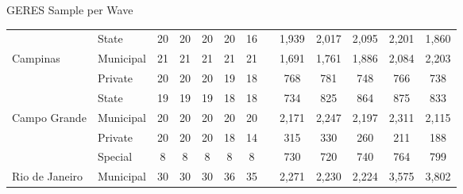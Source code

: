 \documentclass{beamer}
\begin{document}
\begin{frame}[label=SampleWave]{GERES Sample per Wave}
\begin{table}[H]
\begin{adjustbox}{max width=\textwidth}
\begin{tabular}{llllllllllllr}
\cmidrule{1-7}\cmidrule{9-13}          & State & \multicolumn{1}{c}{20 } & \multicolumn{1}{c}{20 } & \multicolumn{1}{c}{20 } & \multicolumn{1}{c}{20 } & \multicolumn{1}{c}{16 } &       & \multicolumn{1}{c}{1,939 } & \multicolumn{1}{c}{2,017} & \multicolumn{1}{c}{2,095 } & \multicolumn{1}{c}{2,201 } & \multicolumn{1}{c}{1,860 } \\
    Campinas & Municipal & \multicolumn{1}{c}{21 } & \multicolumn{1}{c}{21 } & \multicolumn{1}{c}{21 } & \multicolumn{1}{c}{21 } & \multicolumn{1}{c}{21 } &       & \multicolumn{1}{c}{1,691 } & \multicolumn{1}{c}{1,761} & \multicolumn{1}{c}{1,886 } & \multicolumn{1}{c}{2,084 } & \multicolumn{1}{c}{2,203 } \\
          & Private & \multicolumn{1}{c}{20 } & \multicolumn{1}{c}{20 } & \multicolumn{1}{c}{20 } & \multicolumn{1}{c}{19 } & \multicolumn{1}{c}{18 } &       & \multicolumn{1}{c}{768 } & \multicolumn{1}{c}{781} & \multicolumn{1}{c}{748 } & \multicolumn{1}{c}{766 } & \multicolumn{1}{c}{738 } \\
\cmidrule{1-7}\cmidrule{9-13}          & State & \multicolumn{1}{c}{19 } & \multicolumn{1}{c}{19 } & \multicolumn{1}{c}{19 } & \multicolumn{1}{c}{18 } & \multicolumn{1}{c}{18 } &       & \multicolumn{1}{c}{734 } & \multicolumn{1}{c}{825} & \multicolumn{1}{c}{864 } & \multicolumn{1}{c}{875 } & \multicolumn{1}{c}{833 } \\
    Campo Grande & Municipal & \multicolumn{1}{c}{20 } & \multicolumn{1}{c}{20 } & \multicolumn{1}{c}{20 } & \multicolumn{1}{c}{20 } & \multicolumn{1}{c}{20 } &       & \multicolumn{1}{c}{2,171 } & \multicolumn{1}{c}{2,247} & \multicolumn{1}{c}{2,197 } & \multicolumn{1}{c}{2,311 } & \multicolumn{1}{c}{2,115 } \\
          & Private & \multicolumn{1}{c}{20 } & \multicolumn{1}{c}{20 } & \multicolumn{1}{c}{20 } & \multicolumn{1}{c}{18 } & \multicolumn{1}{c}{14 } &       & \multicolumn{1}{c}{315 } & \multicolumn{1}{c}{330} & \multicolumn{1}{c}{260 } & \multicolumn{1}{c}{211 } & \multicolumn{1}{c}{188 } \\
\cmidrule{1-7}\cmidrule{9-13}          & Special & \multicolumn{1}{c}{8 } & \multicolumn{1}{c}{8 } & \multicolumn{1}{c}{8 } & \multicolumn{1}{c}{8 } & \multicolumn{1}{c}{8 } &       & \multicolumn{1}{c}{730 } & \multicolumn{1}{c}{720} & \multicolumn{1}{c}{740 } & \multicolumn{1}{c}{764 } & \multicolumn{1}{c}{799 } \\
    Rio de Janeiro & Municipal & \multicolumn{1}{c}{30 } & \multicolumn{1}{c}{30 } & \multicolumn{1}{c}{30 } & \multicolumn{1}{c}{36 } & \multicolumn{1}{c}{35 } &       & \multicolumn{1}{c}{2,271 } & \multicolumn{1}{c}{2,230} & \multicolumn{1}{c}{2,224 } & \multicolumn{1}{c}{3,575 } & \multicolumn{1}{c}{3,802 } \\

\end{tabular}
\end{adjustbox}
\end{table}
\end{frame}
\end{document}
